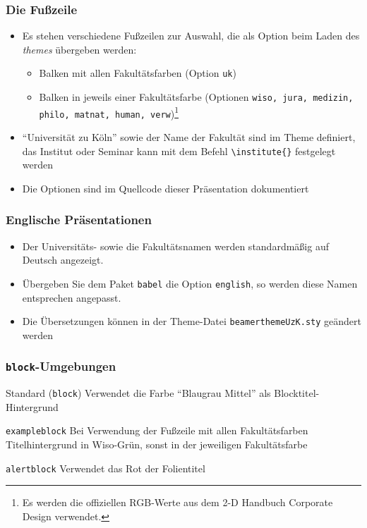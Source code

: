 \documentclass[9pt]{beamer}
\begin{document}
\begin{frame}
  \frametitle{Die Fußzeile}

  \begin{itemize}
  \item Es stehen verschiedene Fußzeilen zur Auswahl, die als Option
    beim Laden des \emph{themes} übergeben werden:
    \begin{itemize}
    \item Balken mit allen Fakultätsfarben (Option \texttt{uk})
    \item Balken in jeweils einer Fakultätsfarbe (Optionen \texttt{wiso, jura,
        medizin, philo, matnat, human, verw})\footnote{Es werden die offiziellen
        RGB-Werte aus dem 2-D Handbuch Corporate Design verwendet.}
    \end{itemize}
  \item "`Universität zu Köln"' sowie der Name der Fakultät sind im
    Theme definiert, das Institut oder Seminar kann mit dem Befehl
    \texttt{\textbackslash institute\{\}} festgelegt werden
  \item Die Optionen sind im Quellcode dieser Präsentation dokumentiert
  \end{itemize}

\end{frame}

\begin{frame}
  \frametitle{Englische Präsentationen}
  \begin{itemize}
  \item Der Universitäts- sowie die Fakultätsnamen werden
    standardmäßig auf Deutsch angezeigt.
  \item Übergeben Sie dem Paket \texttt{babel} die Option
    \texttt{english}, so werden diese Namen entsprechen angepasst.
  \item Die Übersetzungen können in der Theme-Datei
    \texttt{beamerthemeUzK.sty} geändert werden
  \end{itemize}

\end{frame}

\begin{frame}
  \frametitle{\texttt{block}-Umgebungen}
  \begin{block}{Standard (\texttt{block})}
    Verwendet die Farbe "`Blaugrau Mittel"' als Blocktitel-Hintergrund
  \end{block}

  \begin{exampleblock}{\texttt{exampleblock}}
    Bei Verwendung der Fußzeile mit allen Fakultätsfarben
    Titelhintergrund in Wiso-Grün, sonst in der jeweiligen
    Fakultätsfarbe
  \end{exampleblock}

  \begin{alertblock}{\texttt{alertblock}}
    Verwendet das Rot der Folientitel
  \end{alertblock}

\end{frame}
\end{document}
